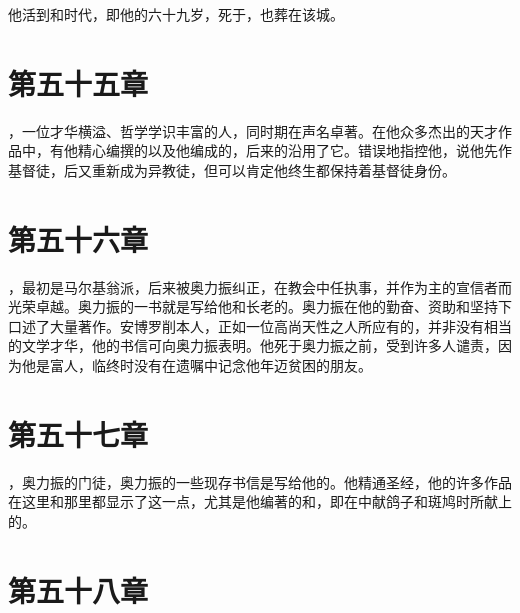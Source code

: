 他活到和时代，即他的六十九岁，死于，也葬在该城。\par


\section{第五十五章}

，一位才华横溢、哲学学识丰富的人，同时期在声名卓著。在他众多杰出的天才作品中，有他精心编撰的以及他编成的，后来的沿用了它。错误地指控他，说他先作基督徒，后又重新成为异教徒，但可以肯定他终生都保持着基督徒身份。\par


\section{第五十六章}

，最初是马尔基翁派，后来被奥力振纠正，在教会中任执事，并作为主的宣信者而光荣卓越。奥力振的一书就是写给他和长老的。奥力振在他的勤奋、资助和坚持下口述了大量著作。安博罗削本人，正如一位高尚天性之人所应有的，并非没有相当的文学才华，他的书信可向奥力振表明。他死于奥力振之前，受到许多人谴责，因为他是富人，临终时没有在遗嘱中记念他年迈贫困的朋友。\par


\section{第五十七章}

，奥力振的门徒，奥力振的一些现存书信是写给他的。他精通圣经，他的许多作品在这里和那里都显示了这一点，尤其是他编著的和，即在中献鸽子和斑鸠时所献上的。\par


\section{第五十八章}

